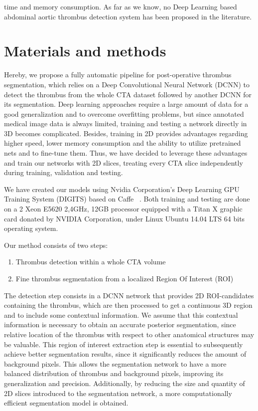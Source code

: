 \documentclass[preprint,authoryear,12pt]{elsarticle}
\begin{document}
time and memory consumption. As far as we know, no Deep Learning based abdominal aortic thrombus detection system has been proposed in the literature.

\section{Materials and methods}
\label{sec:methods}
Hereby, we propose a fully automatic pipeline for post-operative thrombus segmentation, which relies on a Deep Convolutional Neural Network (DCNN) to detect the thrombus from the whole CTA dataset followed by another DCNN for its segmentation. Deep learning approaches require a large amount of data for a good generalization and to overcome overfitting problems, but since annotated medical image data is always limited, training and testing a network directly in 3D becomes complicated. Besides, training in 2D provides advantages regarding higher speed, lower memory consumption and the ability to utilize pretrained nets and to fine-tune them. Thus, we have decided to leverage these advantages and train our networks with 2D slices, treating every CTA slice independently during training, validation and testing.

We have created our models using Nvidia Corporation's Deep Learning GPU Training System (DIGITS) based on Caffe ~\citep{caffe}. Both training and testing are done on a 2 Xeon E5620 2,4GHz, 12GB processor equipped with a Titan X graphic card donated by NVIDIA Corporation, under Linux Ubuntu 14.04 LTS 64 bits operating system.

Our method consists of two steps: 
\begin{enumerate}
\item Thrombus detection within a whole CTA volume
\item Fine thrombus segmentation from a localized Region Of Interest (ROI)
\end{enumerate}\par

The detection step consists in a DCNN network that provides 2D ROI-candidates containing the thrombus, which are then processed to get a continuous 3D region and to include some contextual information. We assume that this contextual information is necessary to obtain an accurate posterior segmentation, since relative location of the thrombus with respect to other anatomical structures may be valuable. This region of interest extraction step is essential to subsequently achieve better segmentation results, since it significantly reduces the amount of background pixels. This allows the segmentation network to have a more balanced distribution of thrombus and background pixels, improving its generalization and precision. Additionally, by reducing the size and quantity of 2D slices introduced to the segmentation network, a more computationally efficient segmentation model is obtained. 
\end{document}
